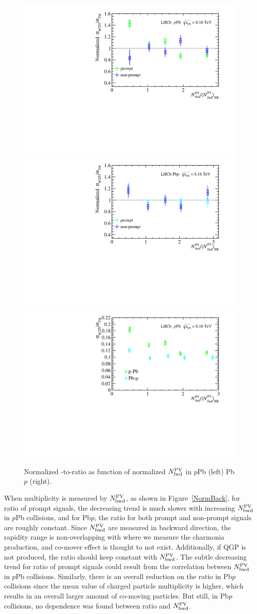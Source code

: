 \begin{figure}[H]
\begin{center}
\includegraphics[width=0.49\linewidth]{pdf/pPb/FWorkdir/Result/All.pdf}
\includegraphics[width=0.49\linewidth]{pdf/Pbp/FWorkdir/Result/All.pdf}
\includegraphics[width=0.7\linewidth]{pdf/pPb/FWorkdir/Result/Norm.pdf}
\end{center}
\caption{Normalized \psitwos-to-\jpsi ratio as function of normalized $N_{\rm fwd}^{\rm PV}$ in $p$Pb (left) Pb$p$ (right).}
\label{NormFor}
\end{figure}
When multiplicity is measured by $N_{\rm bwd}^{\rm PV}$, as shown in Figure~\ref{NormBack}, for ratio of prompt signals, the decreasing trend is much slower with increasing $N_{\rm bwd}^{\rm PV}$ in $p$Pb collisions, and for Pb$p$, the ratio for both prompt and non-prompt signals are roughly constant. Since $N_{\rm bwd}^{\rm PV}$ are measured in backward direction, the rapidity range is non-overlapping with where we measure the charmonia production, and co-mover effect is thought to not exist. Additionally, if QGP is not produced, the ratio should keep constant with $N_{\rm bwd}^{\rm PV}$. The subtle decreasing trend for ratio of prompt signals could result from the correlation between $N_{\rm bwd}^{\rm PV}$ in $p$Pb collisions. Similarly, there is an overall reduction on the ratio in Pb$p$ collisions since the mean value of charged particle multiplicity is higher, which results in an overall larger amount of co-moving particles. But still, in Pb$p$ collisions, no dependence was found between ratio and $N_{\rm bwd}^{\rm PV}$.

